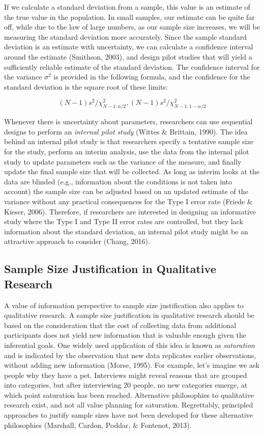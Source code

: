 \documentclass[
  english,
  ,jou, a4paper,floatsintext]{apa6}
\begin{document}
If we calculate a standard deviation from a sample, this value is an estimate of the true value in the population. In small samples, our estimate can be quite far off, while due to the law of large numbers, as our sample size increases, we will be measuring the standard deviation more accurately. Since the sample standard deviation is an estimate with uncertainty, we can calculate a confidence interval around the estimate (Smithson, 2003), and design pilot studies that will yield a sufficiently reliable estimate of the standard deviation. The confidence interval for the variance \(\sigma^2\) is provided in the following formula, and the confidence for the standard deviation is the square root of these limits:

\[(N - 1)s^2/\chi^2_{N-1:\alpha/2},(N - 1)s^2/\chi^2_{N-1:1-\alpha/2}\]

Whenever there is uncertainty about parameters, researchers can use sequential designs to perform an \emph{internal pilot study} (Wittes \& Brittain, 1990). The idea behind an internal pilot study is that researchers specify a tentative sample size for the study, perform an interim analysis, use the data from the internal pilot study to update parameters such as the variance of the measure, and finally update the final sample size that will be collected. As long as interim looks at the data are blinded (e.g., information about the conditions is not taken into account) the sample size can be adjusted based on an updated estimate of the variance without any practical consequences for the Type I error rate (Friede \& Kieser, 2006). Therefore, if researchers are interested in designing an informative study where the Type I and Type II error rates are controlled, but they lack information about the standard deviation, an internal pilot study might be an attractive approach to consider (Chang, 2016).

\hypertarget{sample-size-justification-in-qualitative-research}{%
\subsection{Sample Size Justification in Qualitative Research}\label{sample-size-justification-in-qualitative-research}}

A value of information perspective to sample size justification also applies to qualitative research. A sample size justification in qualitative research should be based on the consideration that the cost of collecting data from additional participants does not yield new information that is valuable enough given the inferential goals. One widely used application of this idea is known as \emph{saturation} and is indicated by the observation that new data replicates earlier observations, without adding new information (Morse, 1995). For example, let's imagine we ask people why they have a pet. Interviews might reveal reasons that are grouped into categories, but after interviewing 20 people, no new categories emerge, at which point saturation has been reached. Alternative philosophies to qualitative research exist, and not all value planning for saturation. Regrettably, principled approaches to justify sample sizes have not been developed for these alternative philosophies (Marshall, Cardon, Poddar, \& Fontenot, 2013).
\end{document}
